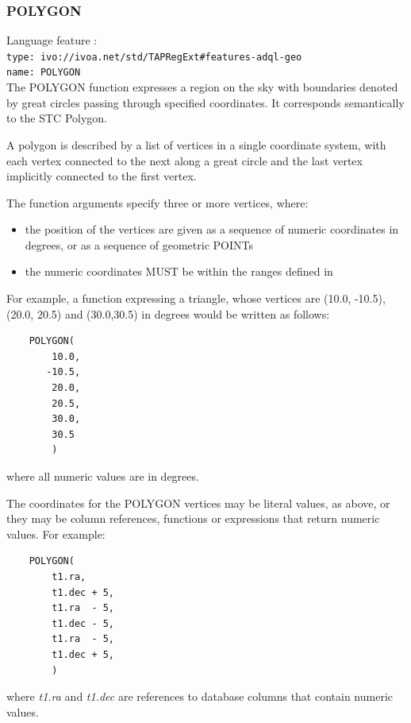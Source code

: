 \documentclass[11pt,a4paper]{ivoa}
\begin{document}
\subsubsection{POLYGON}
\label{sec:functions.geom.polygon}
{\footnotesize Language feature :}\\
{\footnotesize \verb|type: ivo://ivoa.net/std/TAPRegExt#features-adql-geo|}\\
{\footnotesize \verb|name: POLYGON|}\\

The POLYGON function expresses a region on the sky with boundaries denoted by great
circles passing through specified coordinates. It corresponds semantically
to the STC Polygon.

A polygon is described by a list of vertices in a single coordinate system, with
each vertex connected to the next along a great circle and the last vertex
implicitly connected to the first vertex.

The function arguments specify three or more vertices, where:
\begin{itemize}
    \item the position of the vertices are given as a sequence of
    numeric coordinates in degrees, or as a sequence of geometric POINTs
    \item the numeric coordinates MUST be within the ranges defined in
\end{itemize}

For example, a function expressing a triangle, whose vertices are (10.0,
-10.5), (20.0, 20.5) and (30.0,30.5) in degrees would be written
as follows:
\begin{verbatim}
    POLYGON(
        10.0,
       -10.5,
        20.0,
        20.5,
        30.0,
        30.5
        )
\end{verbatim}
\noindent
where all numeric values are in degrees.

The coordinates for the POLYGON vertices may be literal values, as above,
or they may be column references, functions or expressions that return
numeric values.
For example:
\begin{verbatim}
    POLYGON(
        t1.ra,
        t1.dec + 5,
        t1.ra  - 5,
        t1.dec - 5,
        t1.ra  - 5,
        t1.dec + 5,
        )
\end{verbatim}
\noindent
where \textit{t1.ra} and \textit{t1.dec} are references to database columns
that contain numeric values.
\end{document}
